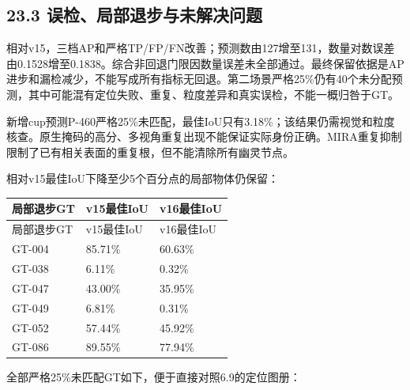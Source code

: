 \documentclass[UTF8,fontset=fandol]{ctexart}
\begin{document}
\subsection*{23.3 误检、局部退步与未解决问题}

相对v15，三档AP和严格TP/FP/FN改善；预测数由127增至131，数量对数误差由0.1528增至0.1838。综合非回退门限因数量误差未全部通过。最终保留依据是AP进步和漏检减少，不能写成所有指标无回退。第二场景严格25\%仍有40个未分配预测，其中可能混有定位失败、重复、粒度差异和真实误检，不能一概归咎于GT。



新增cup预测P-460严格25\%未匹配，最佳IoU只有3.18\%；该结果仍需视觉和粒度核查。原生掩码的高分、多视角重复出现不能保证实际身份正确。MIRA重复抑制限制了已有相关表面的重复根，但不能清除所有幽灵节点。



相对v15最佳IoU下降至少5个百分点的局部物体仍保留：



{\small
\begin{longtable}{|p{}|p{}|p{}|}
\hline
局部退步GT & v15最佳IoU & v16最佳IoU \\ \hline
\endfirsthead
\hline
局部退步GT & v15最佳IoU & v16最佳IoU \\ \hline
\endhead
GT-004 & 85.71\% & 60.63\% \\ \hline
GT-038 & 6.11\% & 0.32\% \\ \hline
GT-047 & 43.00\% & 35.95\% \\ \hline
GT-049 & 6.81\% & 0.31\% \\ \hline
GT-052 & 57.44\% & 45.92\% \\ \hline
GT-086 & 89.55\% & 77.94\% \\ \hline
\end{longtable}
}

全部严格25\%未匹配GT如下，便于直接对照6.9的定位图册：
\end{document}
